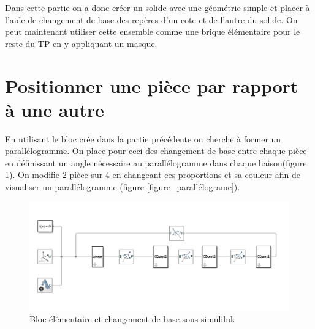 \documentclass[12pt,a4paper]{article}
\begin{document}
\newpage

Dans cette partie on a donc créer un solide avec une géométrie simple et placer à l'aide de changement de base des repères d'un cote et de l'autre du solide. On peut maintenant utiliser cette ensemble comme une brique élémentaire pour le reste du TP en y appliquant un masque.



\section{Positionner une pièce par rapport à une autre}

En utilisant le bloc crée dans la partie précédente on cherche à former un parallélogramme. On place pour ceci des changement de base entre chaque pièce en définissant un angle nécessaire au parallélogramme dans chaque liaison(figure \ref{simulink_parallélograme}). On modifie 2 pièce sur 4 en changeant ces proportions et sa couleur afin de visualiser un parallélogramme (figure \ref{figure_parallélograme}).

\begin{figure}[h!]
\centering
\includegraphics[scale=0.5]{parallelo.png}
\caption{Bloc élémentaire et changement de base sous simulilnk}
\label{simulink_parallélograme}
\end{figure}
\end{document}
